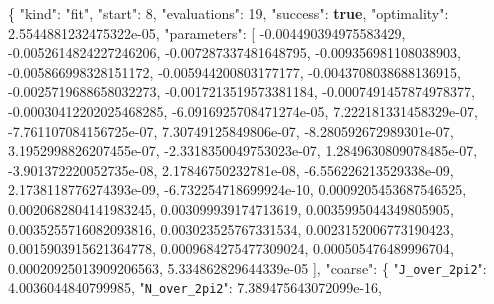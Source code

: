 \documentclass[
  10pt,
]{article}
\newenvironment{Shaded}{}{}
\newcommand{\DataTypeTok}[1]{\textcolor[rgb]{0.56,0.13,0.00}{#1}}
\newcommand{\DecValTok}[1]{\textcolor[rgb]{0.25,0.63,0.44}{#1}}
\newcommand{\FloatTok}[1]{\textcolor[rgb]{0.25,0.63,0.44}{#1}}
\newcommand{\FunctionTok}[1]{\textcolor[rgb]{0.02,0.16,0.49}{#1}}
\newcommand{\KeywordTok}[1]{\textcolor[rgb]{0.00,0.44,0.13}{\textbf{#1}}}
\newcommand{\OtherTok}[1]{\textcolor[rgb]{0.00,0.44,0.13}{#1}}
\newcommand{\StringTok}[1]{\textcolor[rgb]{0.25,0.44,0.63}{#1}}
\begin{document}
\begin{Shaded}
\begin{Highlighting}[]
\FunctionTok{\{}
  \DataTypeTok{"kind"}\FunctionTok{:} \StringTok{"fit"}\FunctionTok{,}
  \DataTypeTok{"start"}\FunctionTok{:} \DecValTok{8}\FunctionTok{,}
  \DataTypeTok{"evaluations"}\FunctionTok{:} \DecValTok{19}\FunctionTok{,}
  \DataTypeTok{"success"}\FunctionTok{:} \KeywordTok{true}\FunctionTok{,}
  \DataTypeTok{"optimality"}\FunctionTok{:} \FloatTok{2.5544881232475322e{-}05}\FunctionTok{,}
  \DataTypeTok{"parameters"}\FunctionTok{:} \OtherTok{[}
    \FloatTok{{-}0.004490394975583429}\OtherTok{,}
    \FloatTok{{-}0.0052614824227246206}\OtherTok{,}
    \FloatTok{{-}0.007287337481648795}\OtherTok{,}
    \FloatTok{{-}0.009356981108038903}\OtherTok{,}
    \FloatTok{{-}0.005866998328151172}\OtherTok{,}
    \FloatTok{{-}0.005944200803177177}\OtherTok{,}
    \FloatTok{{-}0.0043708038688136915}\OtherTok{,}
    \FloatTok{{-}0.0025719688658032273}\OtherTok{,}
    \FloatTok{{-}0.0017213519573381184}\OtherTok{,}
    \FloatTok{{-}0.0007491457874978377}\OtherTok{,}
    \FloatTok{{-}0.00030412202025468285}\OtherTok{,}
    \FloatTok{{-}6.0916925708471274e{-}05}\OtherTok{,}
    \FloatTok{7.222181331458329e{-}07}\OtherTok{,}
    \FloatTok{{-}7.761107084156725e{-}07}\OtherTok{,}
    \FloatTok{7.30749125849806e{-}07}\OtherTok{,}
    \FloatTok{{-}8.280592672989301e{-}07}\OtherTok{,}
    \FloatTok{3.1952998826207455e{-}07}\OtherTok{,}
    \FloatTok{{-}2.3318350049753023e{-}07}\OtherTok{,}
    \FloatTok{1.2849630809078485e{-}07}\OtherTok{,}
    \FloatTok{{-}3.901372220052735e{-}08}\OtherTok{,}
    \FloatTok{2.17846750232781e{-}08}\OtherTok{,}
    \FloatTok{{-}6.556226213529338e{-}09}\OtherTok{,}
    \FloatTok{2.1738118776274393e{-}09}\OtherTok{,}
    \FloatTok{{-}6.732254718699924e{-}10}\OtherTok{,}
    \FloatTok{0.0009205453687546525}\OtherTok{,}
    \FloatTok{0.0020682804141983245}\OtherTok{,}
    \FloatTok{0.003099939174713619}\OtherTok{,}
    \FloatTok{0.0035995044349805905}\OtherTok{,}
    \FloatTok{0.0035255716082093816}\OtherTok{,}
    \FloatTok{0.003023525767331534}\OtherTok{,}
    \FloatTok{0.0023152006773190423}\OtherTok{,}
    \FloatTok{0.0015903915621364778}\OtherTok{,}
    \FloatTok{0.0009684275477309024}\OtherTok{,}
    \FloatTok{0.000505476489996704}\OtherTok{,}
    \FloatTok{0.00020925013909206563}\OtherTok{,}
    \FloatTok{5.334862829644339e{-}05}
  \OtherTok{]}\FunctionTok{,}
  \DataTypeTok{"coarse"}\FunctionTok{:} \FunctionTok{\{}
    \DataTypeTok{"\nolinkurl{J_over_2pi2}"}\FunctionTok{:} \FloatTok{4.0036044840799985}\FunctionTok{,}
    \DataTypeTok{"\nolinkurl{N_over_2pi2}"}\FunctionTok{:} \FloatTok{7.389475643072099e{-}16}\FunctionTok{,}

\end{Highlighting}
\end{Shaded}
\end{document}
